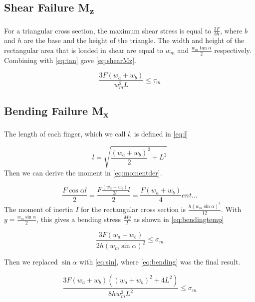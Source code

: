 \subsection{Shear Failure M\textsubscript{z}}
For a triangular cross section, the maximum shear stress is equal to $\frac{3F}{bh}$, where $b$ and $h$ are the base and the height of the triangle. The width and height of the rectangular area that is loaded in shear are equal to $w_m$ and $\frac{w_m \tan \alpha}{2} $ respectively. Combining with \ref{eq:tan} gave \autoref{eq:shearMz}.

\begin{equation}
	\label{eq:shearMz}
	\frac{ 3 F \left(w_a + w_b \right) }{ w_m ^2 L} \le \tau_m	
\end{equation}


\subsection{Bending Failure M\textsubscript{x}}
The length of each finger, which we call $l$, is defined in \autoref{eq:l}

\begin{equation}
	\label{eq:l}
	l = \sqrt{ \frac{\left( w_a + w_b \right)}{2} ^2 + L^2 }
\end{equation}
Then we can derive the moment in \autoref{eq:momentder}.

\begin{equation}
	\label{eq:momentder}
	\frac{F \cos \alpha l}{2} =  \frac{F \frac{\left(w_a + w_b \right)}{2l} l}{2} = \frac{F \left(w_a + w_b\right)}{4}ent...
\end{equation}
The moment of inertia $I$ for the rectangular cross section is $\frac{h \left(w_m \sin \alpha \right)^3}{12}$. With $y = \frac{w_m \sin \alpha }{2}$, this gives a bending stress $\frac{M y}{I}$ as shown in \autoref{eq:bendingtemp}

\begin{equation}
	\label{eq:bendingtemp}
	\frac{3 F\left(w_a + w_b \right)}{2 h \left( w_m \sin \alpha \right)^2 } \le \sigma_m
\end{equation}

Then we replaced $\sin \alpha$ with \ref{eq:sin}, where \autoref{eq:bending} was the final result.

\begin{equation}
	\label{eq:bending}
	\frac{ 3 F \left(w_a + w_b \right) \left(\left(w_a + w_b \right) ^2 + 4L^2 \right)  }{ 8h w_m^2 L^2 }  \le \sigma_m
\end{equation}

